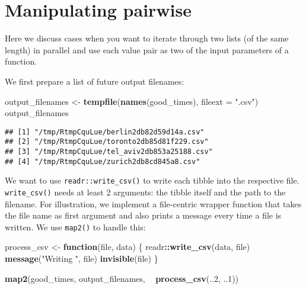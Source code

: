 \documentclass[]{book}
\newenvironment{Shaded}{\begin{snugshade}}{\end{snugshade}}
\newcommand{\ControlFlowTok}[1]{\textcolor[rgb]{0.13,0.29,0.53}{\textbf{#1}}}
\newcommand{\DataTypeTok}[1]{\textcolor[rgb]{0.13,0.29,0.53}{#1}}
\newcommand{\DecValTok}[1]{\textcolor[rgb]{0.00,0.00,0.81}{#1}}
\newcommand{\KeywordTok}[1]{\textcolor[rgb]{0.13,0.29,0.53}{\textbf{#1}}}
\newcommand{\NormalTok}[1]{#1}
\newcommand{\OperatorTok}[1]{\textcolor[rgb]{0.81,0.36,0.00}{\textbf{#1}}}
\newcommand{\StringTok}[1]{\textcolor[rgb]{0.31,0.60,0.02}{#1}}
\begin{document}
\hypertarget{manipulating-pairwise}{%
\section{Manipulating pairwise}\label{manipulating-pairwise}}

Here we discuss cases when you want to iterate through two lists (of the same length) in parallel and use each value pair as two of the input parameters of a function.

We first prepare a list of future output filenames:

\begin{Shaded}
\begin{Highlighting}[]
\NormalTok{output_filenames <-}\StringTok{ }\KeywordTok{tempfile}\NormalTok{(}\KeywordTok{names}\NormalTok{(good_times), }\DataTypeTok{fileext =} \StringTok{".csv"}\NormalTok{)}
\NormalTok{output_filenames}
\end{Highlighting}
\end{Shaded}

\begin{verbatim}
## [1] "/tmp/RtmpCquLue/berlin2db82d59d14a.csv"  
## [2] "/tmp/RtmpCquLue/toronto2db85d81f229.csv" 
## [3] "/tmp/RtmpCquLue/tel_aviv2db853a25188.csv"
## [4] "/tmp/RtmpCquLue/zurich2db8cd845a8.csv"
\end{verbatim}

We want to use \texttt{readr::write\_csv()} to write each tibble into the respective file.
\texttt{write\_csv()} needs at least 2 arguments: the tibble itself and the path to the filename.
For illustration, we implement a file-centric wrapper function that takes the file name as first argument and also prints a message every time a file is written.
We use \texttt{map2()} to handle this:

\begin{Shaded}
\begin{Highlighting}[]
\NormalTok{process_csv <-}\StringTok{ }\ControlFlowTok{function}\NormalTok{(file, data) \{}
\NormalTok{  readr}\OperatorTok{::}\KeywordTok{write_csv}\NormalTok{(data, file)}
  \KeywordTok{message}\NormalTok{(}\StringTok{"Writing "}\NormalTok{, file)}
  \KeywordTok{invisible}\NormalTok{(file)}
\NormalTok{\}}

\KeywordTok{map2}\NormalTok{(good_times, output_filenames, }\OperatorTok{~}\StringTok{ }\KeywordTok{process_csv}\NormalTok{(..}\DecValTok{2}\NormalTok{, ..}\DecValTok{1}\NormalTok{))}
\end{Highlighting}
\end{Shaded}
\end{document}
